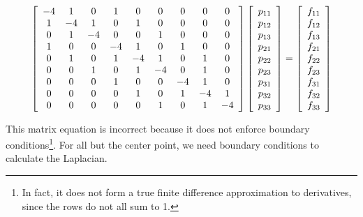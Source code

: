\documentclass[12pt]{article}
\begin{document}
\[ \left[ \begin{array}{c c c c c c c c c} 
-4&1&0&1&0&0&0&0&0\\ 
1&-4&1&0&1&0&0&0&0\\ 
0&1&-4&0&0&1&0&0&0\\ 
1&0&0&-4&1&0&1&0&0\\ 
0&1&0&1&-4&1&0&1&0 \\ 
0&0&1&0&1&-4&0&1&0\\ 
0&0&0&1&0&0&-4&1&0\\ 
0&0&0&0&1&0&1&-4&1\\ 
0&0&0&0&0&1&0&1&-4\\ \end{array} \right] \left[ \begin{array}{c} p_{11}\\p_{12}\\p_{13}\\p_{21}\\p_{22}\\p_{23}\\p_{31}\\p_{32}\\p_{33}\\ \end{array}\right] = \left[ \begin{array}{c} f_{11}\\f_{12}\\f_{13}\\f_{21}\\f_{22}\\f_{23}\\f_{31}\\f_{32}\\f_{33}\\ \end{array}\right]
\]

This matrix equation is incorrect because it does not enforce boundary conditions\footnote{In fact, it does not form a true finite difference approximation to derivatives, since the rows do not all sum to 1.}. For all but the center point, we need boundary conditions to calculate the Laplacian.  
\end{document}
